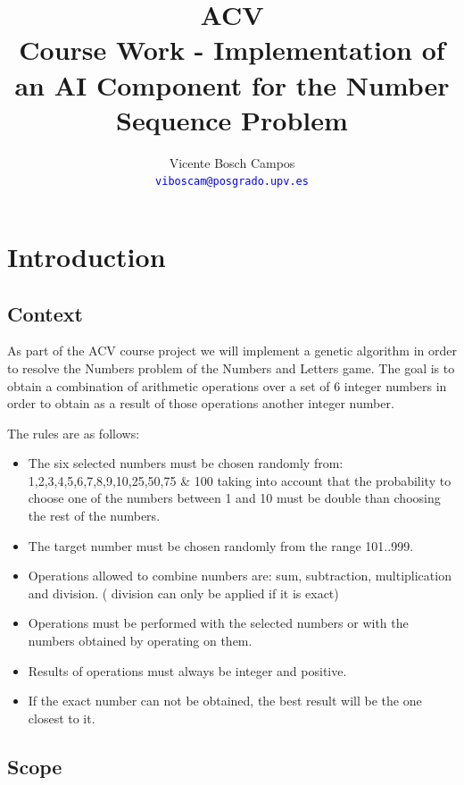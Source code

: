 \documentclass[a4paper,10pt,titlepage]{article}
\title{ACV \\ Course Work - Implementation of an AI Component for the Number Sequence Problem}
\author{Vicente Bosch Campos \dag \\
\textcolor{blue}{\texttt{viboscam@posgrado.upv.es}}}
\begin{document}
\ifpdf
{}
\else
{}
\fi

\maketitle

\tableofcontents

\listoffigures

\newpage

\section{Introduction}
\subsection{Context}

\par As part of the ACV course project we will implement a genetic algorithm in order to resolve the Numbers problem of the Numbers and Letters game. The goal is to obtain a combination of arithmetic operations over a set of 6 integer numbers in order to obtain as a result of those operations another integer number.

\par The rules are as follows:
\begin{itemize}
	\item The six selected numbers must be chosen randomly from: 1,2,3,4,5,6,7,8,9,10,25,50,75 \& 100 taking into account that the probability to choose one of the numbers between 1 and 10 must be double than choosing the rest of the numbers.
	\item The target number must be chosen randomly from the range 101..999.
	\item Operations allowed to combine numbers are: sum, subtraction, multiplication and division. ( division can only be applied if it is exact)
	\item Operations must be performed with the selected numbers or with the numbers obtained by operating on them.
	\item Results of operations must always be integer and positive.
	\item If the exact number can not be obtained, the best result will be the one closest to it.
\end{itemize}

\subsection{Scope}
\end{document}
